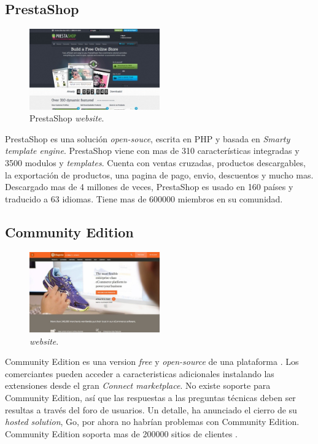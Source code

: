 \newcommand{\namePrestaShop}{PrestaShop }
\subsection{\namePrestaShop}

\begin{figure}[h!]
	\centering
	\includegraphics[width=0.5\textwidth]{figuras/cap1/PrestaShopWebsite.jpg}
	\caption{\namePrestaShop \textit{website}\cite{online_PrestaShop}.}
\end{figure}

\namePrestaShop es una solución \ecommerce \textit{open-souce}, escrita en PHP y basada en \textit{Smarty template engine}. \namePrestaShop viene con mas de 310 características integradas y 3500 modulos y \textit{templates}. Cuenta con ventas cruzadas, productos descargables, la exportación de productos, una pagina de pago, envio, descuentos y mucho mas. Descargado mas de 4 millones de veces, \namePrestaShop es usado en 160 países y traducido a 63 idiomas. Tiene mas de 600000 miembros en su comunidad.

\subsection{\nameMagento Community Edition}

\begin{figure}[h!]
	\centering
	\includegraphics[width=0.5\textwidth]{figuras/cap1/MagentoWebsite.jpg}
	\caption{\nameMagento \textit{website}\cite{online_Magento}.}
\end{figure}

\nameMagento Community Edition es una version \textit{free} y \textit{open-source} de  una plataforma \ecommerce. Los comerciantes pueden acceder a caracteristicas adicionales instalando las extensiones desde el gran \textit{\nameMagento Connect marketplace}. No existe soporte para \nameMagento Community Edition, así que las respuestas a las preguntas técnicas deben ser resultas a través del foro de usuarios. Un detalle, \nameMagento ha anunciado el cierro de su \textit{hosted solution}, \nameMagento Go, por ahora no habrían problemas con Community Edition. \nameMagento Community Edition soporta mas de 200000 sitios de clientes .

